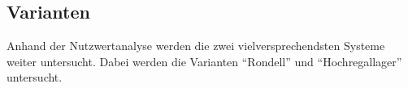 \subsection{Varianten}

Anhand der Nutzwertanalyse werden die zwei vielversprechendsten Systeme weiter untersucht. Dabei werden die Varianten \enquote{Rondell} und \enquote{Hochregallager} untersucht.



